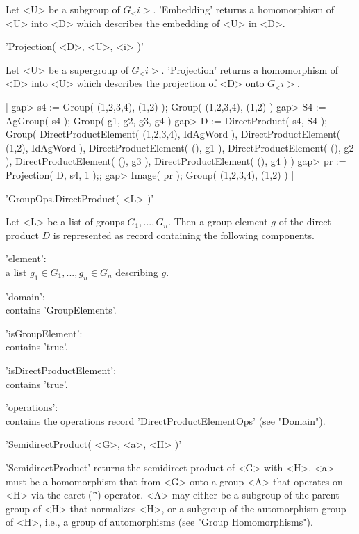 Let <U> be a subgroup of  $G_<i>$. 'Embedding' returns  a homomorphism of
<U> into <D> which describes the embedding of <U> in <D>.

\vspace{5mm}
'Projection( <D>, <U>, <i> )'%

Let <U> be a supergroup of $G_<i>$.  'Projection' returns a  homomorphism
of <D> into <U> which describes the projection of <D> onto $G_<i>$.

|    gap> s4 := Group( (1,2,3,4), (1,2) );
    Group( (1,2,3,4), (1,2) )
    gap> S4 := AgGroup( s4 );
    Group( g1, g2, g3, g4 )
    gap> D := DirectProduct( s4, S4 );
    Group( DirectProductElement(
    (1,2,3,4), IdAgWord ), DirectProductElement(
    (1,2), IdAgWord ), DirectProductElement( (),
    g1 ), DirectProductElement( (), g2 ), DirectProductElement( (),
    g3 ), DirectProductElement( (), g4 ) )
    gap> pr := Projection( D, s4, 1 );;
    gap> Image( pr );
    Group( (1,2,3,4), (1,2) ) |

%

'GroupOps.DirectProduct( <L> )'

Let <L> be a list of groups $G_1, ..., G_n$. Then a group  element $g$ of
the direct product $D$ is represented as  record containing the following
components.

'element': \\
        a list $g_1\in G_1, ..., g_n\in G_n$ describing $g$.

'domain': \\
        contains 'GroupElements'.

'isGroupElement': \\
        contains 'true'.

'isDirectProductElement': \\
        contains 'true'.

'operations': \\
        contains  the    operations   record    'DirectProductElementOps'
        (see "Domain").


'SemidirectProduct( <G>, <a>, <H> )'

'SemidirectProduct' returns the semidirect  product of <G> with <H>.  <a>
must be  a homomorphism  that from  <G> onto a group <A> that operates on
<H> via the caret ('\^')  operator.  <A> may either  be a subgroup of the
parent  group  of   <H>  that  normalizes  <H>,  or  a  subgroup  of  the
automorphism  group  of <H>, i.e., a group  of automorphisms  (see "Group
Homomorphisms").

